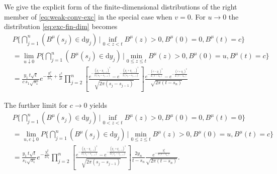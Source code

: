 We give the explicit form of the finite-dimensional distributions of the right member of 
\eqref{eq:weak-conv-exc} in the special case when $ v =0 $. 
For $u\to 0$ the distribution \eqref{eq:exc-fin-dim} becomes
\begin{align*}
&
	P \bigg\{ \bigcap_{j=1}^n \left( B^\mu(s_j) \in \mathrm d y_j \right) \,\Big \vert \inf_{0< z < t} B^\mu(z)> 0 , B^\mu(0)=0, B^\mu(t) = c\bigg \} \\
	&=
	\lim_{ u \downarrow 0}
	P \bigg\{ \bigcap_{j=1}^n \left( B^\mu(s_j) \in \mathrm d y_j \right) \,\Big \vert \min_{0\leq z \leq t} B^\mu(z)> 0 , B^\mu(0)=u, B^\mu(t) = c\bigg \}
	\\
	& =
	\frac{y_1\, t \sqrt t }{c\, s_1 \sqrt{s_1}} e^{- \frac{y_1^2}{2 s_1} + \frac{c^2}{2t}}
	\prod_{j=2}^{n} 
	\left[
	\frac{
		e^{ - \frac{  (y_j - y_{j-1})^2   }{   2(s_j - s_{j-1})   }      } 
		- 
		e^{ - \frac{  (y_j + y_{j-1})^2   }{   2(s_j - s_{j-1})   }      } 
	}
	{
		\sqrt{2\pi ( s_j - s_{j-1})}
	}
	\right]
	\frac{
		e^{ - \frac{  (c - y_{n})^2   }{   2(t - s_{n})   }      } 
		- 
		e^{ - \frac{  (c + y_{n})^2   }{   2(t - s_{n})   }      } 
	}
	{
		\sqrt{2\pi ( t - s_{n})}
	}
\end{align*}
%

%
%
%
The further limit for $c \to 0 $ yields
%
%
\begin{align*}
&
P \bigg\{ \bigcap_{j=1}^n \left( B^\mu(s_j) \in \mathrm d y_j \right) \,\Big \vert \inf_{0< z < t} B^\mu(z)> 0 , B^\mu(0)=0, B^\mu(t) = 0\bigg \} \\
&=
\lim_{ u,c \downarrow 0}
P \bigg\{ \bigcap_{j=1}^n \left( B^\mu(s_j) \in \mathrm d y_j \right) \,\Big \vert \min_{0\leq z \leq t} B^\mu(z)> 0 , B^\mu(0)=u, B^\mu(t) = c\bigg \}
\\
& =
\frac{y_1\, t \sqrt t }{s_1 \sqrt{s_1}} e^{- \frac{y_1^2}{2 s_1}}
\prod_{j=2}^{n} 
\left[
%
\frac{
	e^{ - \frac{  (y_j - y_{j-1})^2   }{   2(s_j - s_{j-1})   }      } 
	- 
	e^{ - \frac{  (y_j + y_{j-1})^2   }{   2(s_j - s_{j-1})   }      } 
}
{
	\sqrt{2\pi ( s_j - s_{j-1})}
}
%
\right]
\frac{2 y_n}{t- s_n}
\frac{
	e^{ - \frac{   y_{n}^2   }{   2(t - s_{n})   }      } 
}
{
	\sqrt{2\pi ( t - s_{n})}
}.
%
\end{align*}




